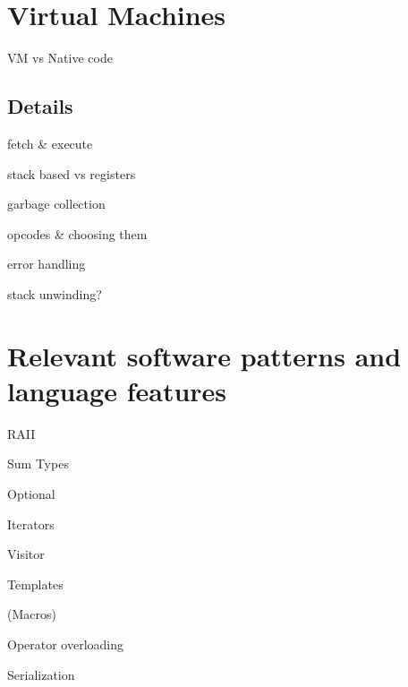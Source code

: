 	\section{Virtual Machines}
	
		VM vs Native code
		
		\subsection{Details} %
			fetch \& execute
			
			stack based vs registers
			
			garbage collection
			
			opcodes \& choosing them
			
			error handling
			
			stack unwinding?
	
	\section{Relevant software patterns and language features}
	
		RAII
		
		Sum Types
		
		Optional
		
		Iterators
		
		Visitor
		
		Templates
		
		(Macros)
		
		Operator overloading
		
		Serialization
